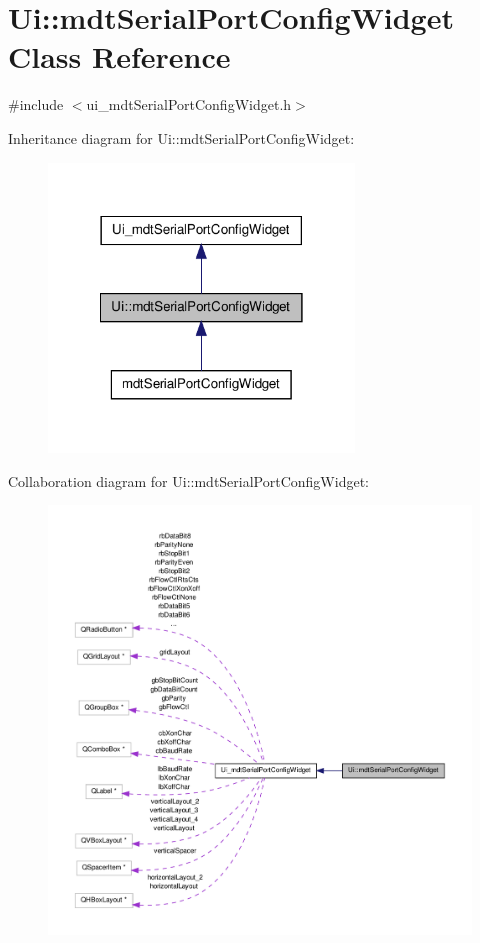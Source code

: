 \hypertarget{class_ui_1_1mdt_serial_port_config_widget}{\section{Ui\-:\-:mdt\-Serial\-Port\-Config\-Widget Class Reference}
\label{class_ui_1_1mdt_serial_port_config_widget}
}


{\ttfamily \#include $<$ui\-\_\-mdt\-Serial\-Port\-Config\-Widget.\-h$>$}



Inheritance diagram for Ui\-:\-:mdt\-Serial\-Port\-Config\-Widget\-:
\nopagebreak
\begin{figure}[H]
\begin{center}
\leavevmode
\includegraphics[width=230pt]{class_ui_1_1mdt_serial_port_config_widget__inherit__graph}
\end{center}
\end{figure}


Collaboration diagram for Ui\-:\-:mdt\-Serial\-Port\-Config\-Widget\-:
\nopagebreak
\begin{figure}[H]
\begin{center}
\leavevmode
\includegraphics[width=350pt]{class_ui_1_1mdt_serial_port_config_widget__coll__graph}
\end{center}
\end{figure}
